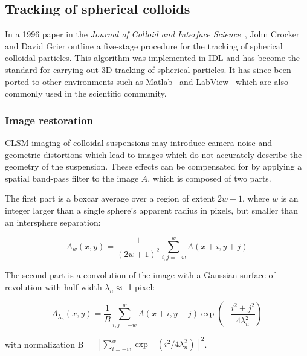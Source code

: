 \subsection{Tracking of spherical colloids}

In a 1996 paper in the \textit{Journal of Colloid and Interface Science}~\cite{crocker-grier-spheres},
John Crocker and David Grier outline a five-stage procedure for the tracking of
spherical colloidal particles.  This algorithm was implemented in IDL and has become the standard for carrying out 
3D tracking of spherical particles. It has since been ported to other environments such as 
Matlab~\cite{blair-dufrense-matlab, kilfoil-matlab} and LabView~\cite{optical-trapping-group} which are
also commonly used in the scientific community.

\subsubsection{Image restoration}
\label{sec:band-pass}

CLSM imaging of colloidal suspensions may introduce camera noise and geometric distortions which 
lead to images which do not
accurately describe the geometry of the suspension. 
These effects can be compensated for by applying a spatial band-pass filter 
to the image $A$, which is composed of two parts.

The first part is a boxcar average over a region of extent $2w + 1$, where $w$ is an integer
larger than a single sphere's apparent radius in pixels, but smaller than an intersphere separation:

\begin{center}\begin{equation}A_w(x,y) = \frac{1}{(2w+1)^2} \sum_{i,j=-w}^w A(x+i,y+j)
\end{equation}\end{center}

The second part is a convolution of the image with a Gaussian surface of revolution with 
half-width $\lambda_n \approx $ 1 pixel:

\begin{center}\begin{equation}A_{\lambda_n}(x,y) = \frac{1}{B} \sum_{i,j=-w}^w A(x+i,y+j)\exp{\left(-\frac{i^2+j^2}{4\lambda_n^2}\right)}
\end{equation}\end{center}

with normalization B = $[\sum_{i=-w}^w \exp{-(i^2/4\lambda_n^2)}]^2$.

